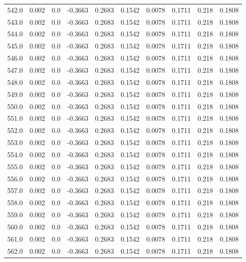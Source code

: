 \begin{longtable}{lrrrrrrrrr}
542.0 & 0.002 & 0.0 & -0.3663 & 0.2683 & 0.1542 & 0.0078 & 0.1711 & 0.218 & 0.1808 \\
543.0 & 0.002 & 0.0 & -0.3663 & 0.2683 & 0.1542 & 0.0078 & 0.1711 & 0.218 & 0.1808 \\
544.0 & 0.002 & 0.0 & -0.3663 & 0.2683 & 0.1542 & 0.0078 & 0.1711 & 0.218 & 0.1808 \\
545.0 & 0.002 & 0.0 & -0.3663 & 0.2683 & 0.1542 & 0.0078 & 0.1711 & 0.218 & 0.1808 \\
546.0 & 0.002 & 0.0 & -0.3663 & 0.2683 & 0.1542 & 0.0078 & 0.1711 & 0.218 & 0.1808 \\
547.0 & 0.002 & 0.0 & -0.3663 & 0.2683 & 0.1542 & 0.0078 & 0.1711 & 0.218 & 0.1808 \\
548.0 & 0.002 & 0.0 & -0.3663 & 0.2683 & 0.1542 & 0.0078 & 0.1711 & 0.218 & 0.1808 \\
549.0 & 0.002 & 0.0 & -0.3663 & 0.2683 & 0.1542 & 0.0078 & 0.1711 & 0.218 & 0.1808 \\
550.0 & 0.002 & 0.0 & -0.3663 & 0.2683 & 0.1542 & 0.0078 & 0.1711 & 0.218 & 0.1808 \\
551.0 & 0.002 & 0.0 & -0.3663 & 0.2683 & 0.1542 & 0.0078 & 0.1711 & 0.218 & 0.1808 \\
552.0 & 0.002 & 0.0 & -0.3663 & 0.2683 & 0.1542 & 0.0078 & 0.1711 & 0.218 & 0.1808 \\
553.0 & 0.002 & 0.0 & -0.3663 & 0.2683 & 0.1542 & 0.0078 & 0.1711 & 0.218 & 0.1808 \\
554.0 & 0.002 & 0.0 & -0.3663 & 0.2683 & 0.1542 & 0.0078 & 0.1711 & 0.218 & 0.1808 \\
555.0 & 0.002 & 0.0 & -0.3663 & 0.2683 & 0.1542 & 0.0078 & 0.1711 & 0.218 & 0.1808 \\
556.0 & 0.002 & 0.0 & -0.3663 & 0.2683 & 0.1542 & 0.0078 & 0.1711 & 0.218 & 0.1808 \\
557.0 & 0.002 & 0.0 & -0.3663 & 0.2683 & 0.1542 & 0.0078 & 0.1711 & 0.218 & 0.1808 \\
558.0 & 0.002 & 0.0 & -0.3663 & 0.2683 & 0.1542 & 0.0078 & 0.1711 & 0.218 & 0.1808 \\
559.0 & 0.002 & 0.0 & -0.3663 & 0.2683 & 0.1542 & 0.0078 & 0.1711 & 0.218 & 0.1808 \\
560.0 & 0.002 & 0.0 & -0.3663 & 0.2683 & 0.1542 & 0.0078 & 0.1711 & 0.218 & 0.1808 \\
561.0 & 0.002 & 0.0 & -0.3663 & 0.2683 & 0.1542 & 0.0078 & 0.1711 & 0.218 & 0.1808 \\
562.0 & 0.002 & 0.0 & -0.3663 & 0.2683 & 0.1542 & 0.0078 & 0.1711 & 0.218 & 0.1808 \\

\end{longtable}
